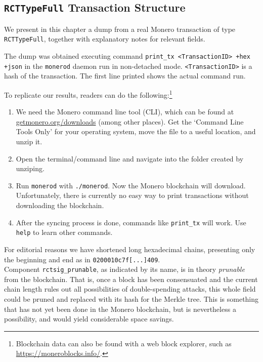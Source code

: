 \begin{appendices}

\renewcommand{\theFancyVerbLine}{%
	\textcolor{red}{\small
		\arabic{FancyVerbLine}}}


\chapter{{\tt RCTTypeFull} Transaction Structure}
\label{appendix:RCTTypeFull}

We present in this chapter a dump from a real Monero transaction of type {\tt RCTTypeFull}, 
together with explanatory notes for relevant fields.

The dump was obtained executing command {\tt print\_tx <TransactionID> +hex +json} in the {\tt monerod} daemon run in non-detached mode. {\tt <TransactionID>} is a hash of the transaction. The first line printed shows the actual command run.%

To replicate our results, readers can do the following:\footnote{Blockchain data can also be found with a web block explorer, such as \url{https://moneroblocks.info/}.}
\begin{enumerate}
    \item We need the Monero command line tool (CLI), which can be found at \url{getmonero.org/downloads} (among other places). Get the `Command Line Tools Only' for your operating system, move the file to a useful location, and unzip it.
    \item Open the terminal/command line and navigate into the folder created by unziping.
    \item Run {\tt monerod} with {\tt ./monerod}. Now the Monero blockchain will download. Unfortunately, there is currently no easy way to print transactions without downloading the blockchain.
    \item After the syncing process is done, commands like {\tt print\_tx} will work. Use {\tt help} to learn other commands.
\end{enumerate}

For editorial reasons we have shortened long hexadecimal chains, presenting only the beginning and end as in {\tt 0200010c7f[...]409}.
\\

Component {\tt rctsig\_prunable}, as indicated by its name, is in theory {\sl prunable} from the blockchain. That is, once a block has been consensuated and the current chain length rules out all possibilities of double-spending attacks, this whole field could be pruned and replaced with its hash for the Merkle tree. This is something that has not yet been done in the Monero blockchain, but is nevertheless a possibility, and would yield considerable space savings. 


\end{appendices}
